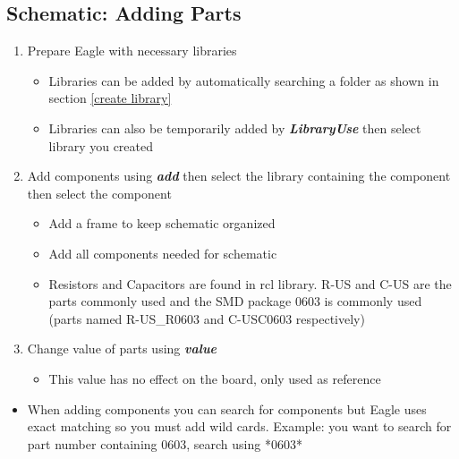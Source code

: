 \documentclass{article}
\begin{document}
\subsection{Schematic: Adding Parts}
\begin{enumerate}
    \item Prepare Eagle with necessary libraries
    \begin{itemize}
        \item Libraries can be added by automatically searching a folder as shown in section \ref{create library}
        \item Libraries can also be temporarily added by \textit{\textbf{Library\textrightarrow Use}} then select library you created
    \end{itemize}
    \item Add components using \textit{\textbf{add}} then select the library containing the component then select the component
    \begin{itemize}
        \item Add a frame to keep schematic organized
        \item Add all components needed for schematic
        \item Resistors and Capacitors are found in rcl library. R-US and C-US are the parts commonly used and the SMD package 0603 is commonly used (parts named R-US\_R0603 and C-USC0603 respectively)
    \end{itemize}
    \item Change value of parts using \textit{\textbf{value}}
    \begin{itemize}
        \item This value has no effect on the board, only used as reference
    \end{itemize}
\end{enumerate}
\begin{tcolorbox} [title=Tips \& Tricks]
    \begin{itemize}
        \item When adding components you can search for components but Eagle uses exact matching so you must add wild cards. Example: you want to search for part number containing 0603, search using *0603*
    \end{itemize}
\end{tcolorbox}
\end{document}
